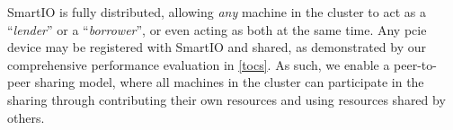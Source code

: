 


\objdistributed*%
%
%
%
SmartIO is fully distributed, allowing \emph{any} machine in the cluster to act as a ``\emph{\gls{lender}}'' or a ``\emph{\gls{borrower}}'', or even acting as both at the same time.
%
Any \gls{pcie} device may be registered with SmartIO and shared, as demonstrated by our comprehensive performance evaluation in \cref{tocs}.
%
As such, we enable a peer-to-peer sharing model, where all machines in the cluster can participate in the sharing through contributing their own resources and using resources shared by others.



